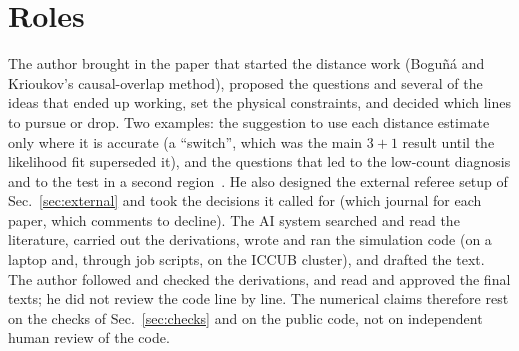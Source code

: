 \documentclass[11pt,a4paper]{article}
\begin{document}
\section{Roles}
The author brought in the paper that started the distance work (Bogu\~n\'a and Krioukov's causal-overlap method), proposed the questions and several of the ideas that ended up working, set the physical constraints, and decided which lines to pursue or drop. Two examples: the suggestion to use each distance estimate only where it is accurate (a ``switch'', which was the main $3+1$ result until the likelihood fit superseded it), and the questions that led to the low-count diagnosis and to the test in a second region~\cite{Embedding}. He also designed the external referee setup of Sec.~\ref{sec:external} and took the decisions it called for (which journal for each paper, which comments to decline). The AI system searched and read the literature, carried out the derivations, wrote and ran the simulation code (on a laptop and, through job scripts, on the ICCUB cluster), and drafted the text. The author followed and checked the derivations, and read and approved the final texts; he did not review the code line by line. The numerical claims therefore rest on the checks of Sec.~\ref{sec:checks} and on the public code, not on independent human review of the code.
\end{document}

